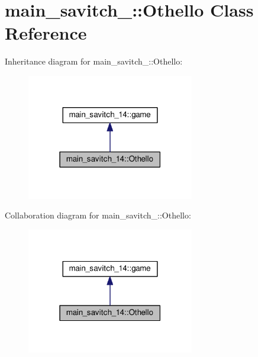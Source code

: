 \hypertarget{classmain__savitch__14_1_1Othello}{}\section{main\+\_\+savitch\+\_\+:\+:Othello Class Reference}
\label{classmain__savitch__14_1_1Othello}


Inheritance diagram for main\+\_\+savitch\+\_\+:\+:Othello\+:\nopagebreak
\begin{figure}[H]
\begin{center}
\leavevmode
\includegraphics[width=207pt]{classmain__savitch__14_1_1Othello__inherit__graph}
\end{center}
\end{figure}


Collaboration diagram for main\+\_\+savitch\+\_\+:\+:Othello\+:\nopagebreak
\begin{figure}[H]
\begin{center}
\leavevmode
\includegraphics[width=207pt]{classmain__savitch__14_1_1Othello__coll__graph}
\end{center}
\end{figure}
